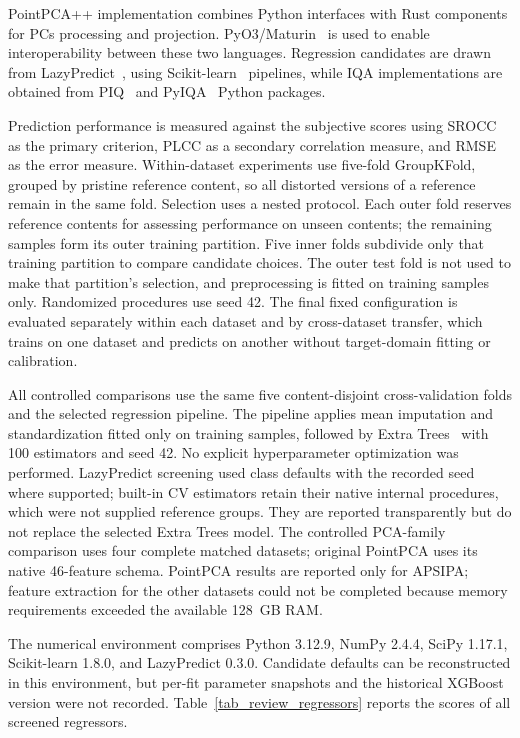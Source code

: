\documentclass[final,3p,times,twocolumn]{elsarticle}
\begin{document}
PointPCA++ implementation combines Python interfaces with Rust components for \glspl{PC} processing and projection. PyO3/Maturin~\cite{johnson2024pyo3} is used to enable interoperability between these two languages. Regression candidates are drawn from LazyPredict~\cite{lazypredict}, using Scikit-learn~\cite{scikit-learn} pipelines, while \gls{IQA} implementations are obtained from \gls{PIQ}~\cite{piq} and \gls{PyIQA}~\cite{pyiqa} Python packages.

Prediction performance is measured against the subjective scores using \gls{SROCC} as the primary criterion, \gls{PLCC} as a secondary correlation measure, and \gls{RMSE} as the error measure. Within-dataset experiments use five-fold GroupKFold, grouped by pristine reference content, so all distorted versions of a reference remain in the same fold. Selection uses a nested protocol. Each outer fold reserves reference contents for assessing performance on unseen contents; the remaining samples form its outer training partition. Five inner folds subdivide only that training partition to compare candidate choices. The outer test fold is not used to make that partition's selection, and preprocessing is fitted on training samples only. Randomized procedures use seed 42. The final fixed configuration is evaluated separately within each dataset and by cross-dataset transfer, which trains on one dataset and predicts on another without target-domain fitting or calibration.

All controlled comparisons use the same five content-disjoint cross-validation folds and the selected regression pipeline. The pipeline applies mean imputation and standardization fitted only on training samples, followed by Extra Trees~\cite{geurts2006extremely} with 100 estimators and seed 42. No explicit hyperparameter optimization was performed. LazyPredict screening used class defaults with the recorded seed where supported; built-in CV estimators retain their native internal procedures, which were not supplied reference groups. They are reported transparently but do not replace the selected Extra Trees model. The controlled PCA-family comparison uses four complete matched datasets; original PointPCA uses its native 46-feature schema. PointPCA results are reported only for APSIPA; feature extraction for the other datasets could not be completed because memory requirements exceeded the available 128~GB RAM.

The numerical environment comprises Python 3.12.9, NumPy 2.4.4, SciPy 1.17.1, Scikit-learn 1.8.0, and LazyPredict 0.3.0. Candidate defaults can be reconstructed in this environment, but per-fit parameter snapshots and the historical XGBoost version were not recorded. Table~\ref{tab_review_regressors} reports the scores of all screened regressors.
\end{document}
